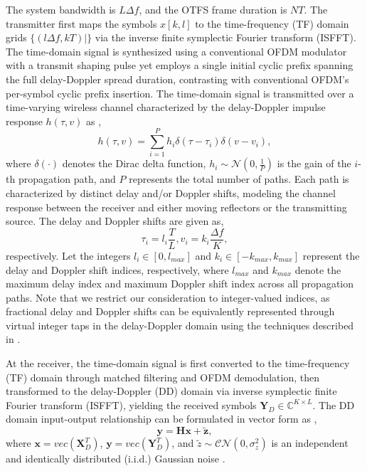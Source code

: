 \documentclass[journal]{IEEEtran}
\begin{document}
The system bandwidth is $L\Delta f$, and the OTFS frame duration is $NT$. The transmitter first maps the symbols $x[k,l]$ to the time-frequency (TF) domain grids $\{(l\Delta f, kT)|\}$ via the inverse finite symplectic Fourier transform (ISFFT). The time-domain signal is synthesized using a conventional OFDM modulator with a transmit shaping pulse yet employs a single initial cyclic prefix spanning the full delay-Doppler spread duration, contrasting with conventional OFDM's per-symbol cyclic prefix insertion. The time-domain signal is transmitted over a time-varying wireless channel characterized by the delay-Doppler impulse response $h(\tau, v)$ as \cite{7925924},
\begin{equation}
h(\tau, v) = \sum_{i=1}^P h_i \delta (\tau - {\tau}_i) \delta (v - v_i) ,
\end{equation}
where $\delta(\cdot)$ denotes the Dirac delta function, $h_i \sim \mathcal{N}(0, \frac{1}{P})$ is the gain of the $i$-th propagation path, and $P$ represents the total number of paths. Each path is characterized by distinct delay and/or Doppler shifts, modeling the channel response between the receiver and either moving reflectors or the transmitting source. The delay and Doppler shifts are given as,
\begin{equation}
{\tau}_i = l_i \frac{T}{L}, v_i = k_i \frac{\Delta f}{K},
\end{equation}
respectively. Let the integers $l_i \in [0, l_{max}]$ and $k_i \in [-k_{max}, k_{max}]$ represent the delay and Doppler shift indices, respectively, where $l_{max}$ and $k_{max}$ denote the maximum delay index and maximum Doppler shift index across all propagation paths. Note that we restrict our consideration to integer-valued indices, as fractional delay and Doppler shifts can be equivalently represented through virtual integer taps in the delay-Doppler domain using the techniques described in \cite{6563167, 8377159, 8516353}.

At the receiver, the time-domain signal is first converted to the time-frequency (TF) domain through matched filtering and OFDM demodulation, then transformed to the delay-Doppler (DD) domain via inverse symplectic finite Fourier transform (ISFFT), yielding the received symbols $\bm{Y}_D\in \mathbb{C}^{K\times L}$. The DD domain input-output relationship can be formulated in vector form as \cite{10264119},
\begin{equation}
\bm{y} = \bm{Hx} + \bm{\tilde{z}},
\label{eq:sys-DD}
\end{equation}
where $\bm{x} = vec(\bm X_D^T)$, $\bm y = vec(\bm Y_D^T)$, and $\tilde{z} \sim \mathcal{CN}(0, \sigma_z^2)$ is an independent and identically distributed (i.i.d.) Gaussian noise \cite{8516353, 10264119, 7925924}.
\end{document}
